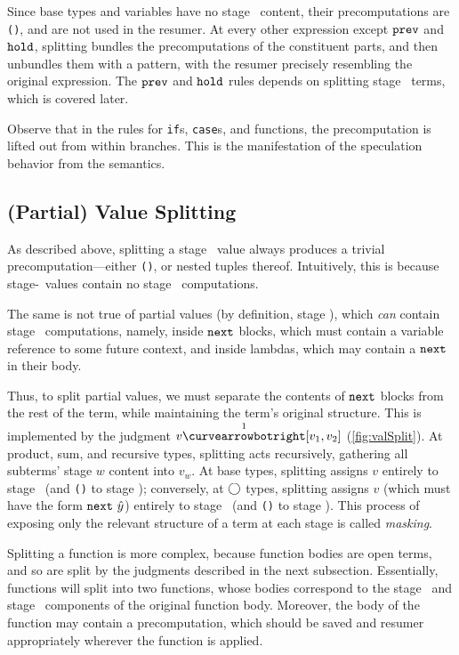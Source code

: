 Since base types and variables have no stage \bbone\ content, their
precomputations are \texttt{()}, and are not used in the resumer. At every other
expression except ${\tt prev}$ and ${\tt hold}$, splitting bundles the precomputations of the
constituent parts, and then unbundles them with a pattern, with the resumer
precisely resembling the original expression. The ${\tt prev}$ and ${\tt hold}$ rules depends on
splitting stage \bbone\ terms, which is covered later.

Observe that in the rules for {\tt if}s, {\tt case}s, and functions, the
precomputation is lifted out from within branches. This is the manifestation of
the speculation behavior from the semantics.


\subsection{(Partial) Value Splitting}

As described above, splitting a stage \bbtwo\ value always produces a trivial
precomputation---either \texttt{()}, or nested tuples thereof. Intuitively,
this is because stage-\bbtwo\ values contain no stage \bbone\ computations.

The same is not true of partial values (by definition, stage \bbone), which \emph{can}
contain stage \bbtwo\ computations, namely, inside ${\tt next}$ blocks, which must
contain a variable reference to some future context, and inside lambdas, which
may contain a ${\tt next}$ in their body.

Thus, to split partial values, we must separate the contents of ${\tt next}$ blocks
from the rest of the term, while maintaining the term's original structure. This
is implemented by the judgment $v \vsplito [v_1,v_2]$ (\ref{fig:valSplit}).
At product, sum, and recursive types, splitting acts recursively, gathering all
subterms' stage $w$ content into $v_w$.
At base types, splitting assigns $v$ entirely to stage \bbone\ (and \texttt{()}
to stage \bbtwo);
conversely, at $\bigcirc$ types, splitting assigns $v$ (which must have the
form ${\tt next}~\hat y$) entirely to stage \bbtwo\ (and \texttt{()} to stage
\bbone).
This process of exposing only the relevant structure of a term at each stage is
called \emph{masking}.

Splitting a function is more complex, because function bodies are open terms,
and so are split by the judgments described in the next subsection. Essentially,
functions will split into two functions, whose bodies correspond to the stage
\bbone\ and stage \bbtwo\ components of the original function body.
Moreover, the body of the function may contain a precomputation,
which should be saved and resumer appropriately wherever the function is applied.

